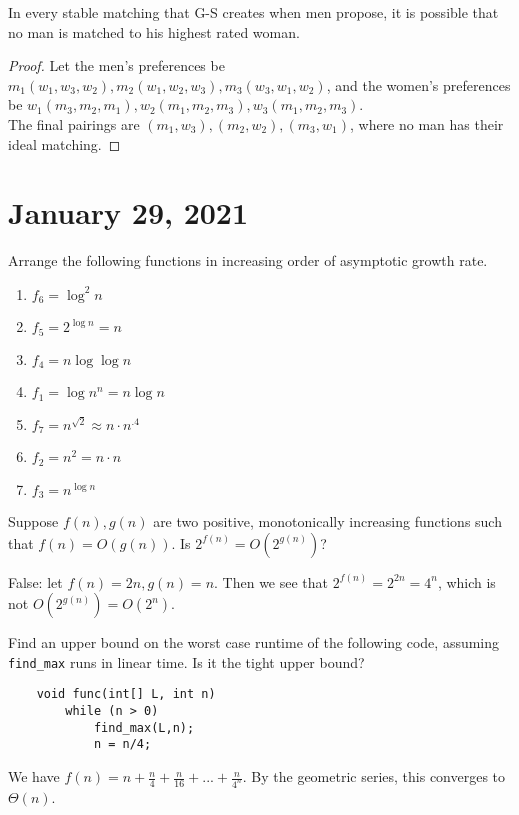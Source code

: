 \documentclass[11pt]{article}
\begin{document}
\begin{exmp}
In every stable matching that G-S creates when men propose, it is possible that no man is matched to his highest rated woman.
\end{exmp}
\begin{proof}
Let the men's preferences be $m_1(w_1, w_3, w_2), m_2(w_1, w_2, w_3), m_3(w_3, w_1, w_2)$, and the women's preferences be $w_1(m_3, m_2, m_1), w_2(m_1, m_2, m_3), w_3(m_1, m_2, m_3)$. \\ The final pairings are $(m_1, w_3), (m_2, w_2), (m_3, w_1)$, where no man has their ideal matching.
\end{proof}
\newpage

\section{January 29, 2021}
\begin{exmp}
Arrange the following functions in increasing order of asymptotic growth rate.
\end{exmp}
\begin{enumerate}
    \item $f_6 = \log^2{n}$
    \item $f_5 = 2^{\log{n}} = n$
    \item $f_4 = n \log\log{n}$
    \item $f_1 = \log{n^n} = n \log n$
    \item $f_7 = n^{\sqrt{2}} \approx n \cdot n^{.4}$
    \item $f_2 = n^2 = n \cdot n$
    \item $f_3 = n^{\log{n}}$
\end{enumerate}
\begin{exmp}
Suppose $f(n), g(n)$ are two positive, monotonically increasing functions such that $f(n) = O(g(n))$. Is $2^{f(n)} = O(2^{g(n)})$?
\end{exmp}
False: let $f(n) = 2n, g(n) = n$. Then we see that $2^{f(n)} = 2^{2n} = 4^n$, which is not $O(2^{g(n)}) = O(2^n)$.

\begin{exmp}
Find an upper bound on the worst case runtime of the following code, assuming \texttt{find\_max} runs in linear time. Is it the tight upper bound?
\end{exmp}

\begin{verbatim}
    void func(int[] L, int n)
        while (n > 0)
            find_max(L,n);
            n = n/4;
\end{verbatim}
We have $f(n) = n + \frac{n}{4} + \frac{n}{16} + ... + \frac{n}{4^n}$. By the geometric series, this converges to $\Theta(n)$.
\end{document}
